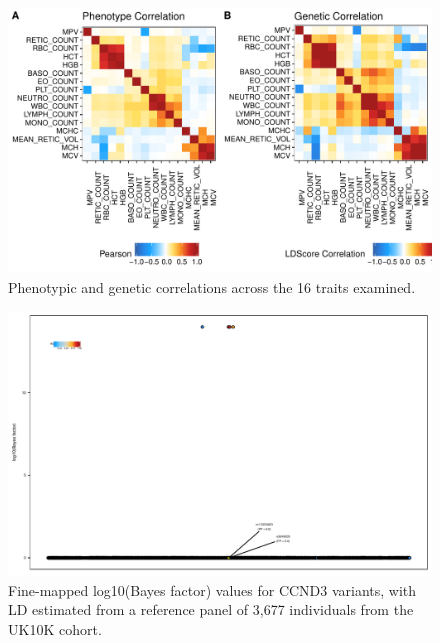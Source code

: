 \documentclass{article}\usepackage[]{graphicx}\usepackage[]{color}
\makeatletter
\def\maxwidth{ %
  \ifdim\Gin@nat@width>\linewidth
    \linewidth
  \else
    \Gin@nat@width
  \fi
}
\newenvironment{knitrout}{}{} %
\makeatother
\begin{document}
\begin{knitrout}
\color{fgcolor}\begin{figure}[H]

{\centering \includegraphics[width=\maxwidth]{figure/correlationPlots-1} 

}

\caption[Phenotypic and genetic correlations across the 16 traits examined]{Phenotypic and genetic correlations across the 16 traits examined. }\label{fig:correlationPlots}
\end{figure}


\end{knitrout}





\begin{knitrout}
\color{fgcolor}\begin{figure}[H]

{\centering \includegraphics[width=\maxwidth]{figure/ccnd3UK10KLD-1} 

}

\caption[Fine-mapped log10(Bayes factor) values for CCND3 variants, with LD estimated from a reference panel of 3,677 individuals from the UK10K cohort]{Fine-mapped log10(Bayes factor) values for CCND3 variants, with LD estimated from a reference panel of 3,677 individuals from the UK10K cohort.}\label{fig:ccnd3UK10KLD}
\end{figure}


\end{knitrout}
\end{document}
